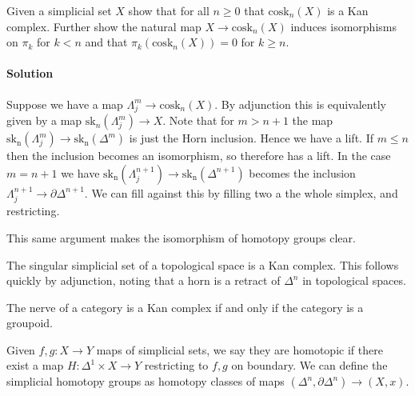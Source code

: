 \begin{exercise}
    Given a simplicial set $X$ show that for all $n \geq 0$ that $\mathrm{cosk}_n(X)$ is a Kan complex.
    Further show the natural map $X \to \mathrm{cosk}_n(X)$ induces isomorphisms on $\pi_k$ for $k < n$ and that $\pi_k(\mathrm{cosk}_n(X)) = 0$ for $k \geq n$.

    \paragraph{Solution} Suppose we have a map $\Lambda_j^m \to \mathrm{cosk}_n(X)$.
    By adjunction this is equivalently given by a map $\mathrm{sk}_n(\Lambda_j^m) \to X$.
    Note that for $m > n+1$ the map $\mathrm{sk_n}(\Lambda_j^m) \to \mathrm{sk_n}(\Delta^m)$ is just the Horn inclusion.
    Hence we have a lift.
    If $m \leq n$ then the inclusion becomes an isomorphism, so therefore has a lift.
    In the case $m = n +1$ we have $\mathrm{sk_n}(\Lambda_j^{n+1}) \to \mathrm{sk_n}(\Delta^{n+1})$ becomes the inclusion $\Lambda_j^{n+1} \to \partial \Delta^{n+1}$.
    We can fill against this by filling two a the whole simplex, and restricting.

    This same argument makes the isomorphism of homotopy groups clear.
\end{exercise}

\begin{example}
    The singular simplicial set of a topological space is a Kan complex.
    This follows quickly by adjunction, noting that a horn is a retract of $\Delta^n$ in topological spaces.
\end{example}

\begin{example}
    The nerve of a category is a Kan complex if and only if the category is a groupoid.
\end{example}

\begin{definition}
    Given $f, g : X \to Y$ maps of simplicial sets, we say they are homotopic if there exist a map $H : \Delta^1 \times X \to Y$ restricting to $f, g$ on boundary.
    We can define the simplicial homotopy groups as homotopy classes of maps $(\Delta^n, \partial \Delta^n) \to (X, x)$.
\end{definition}
